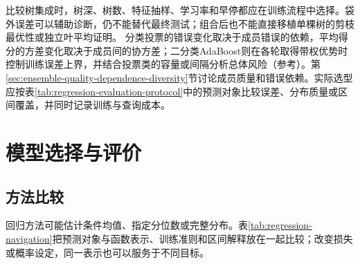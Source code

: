 比较树集成时，树深、树数、特征抽样、学习率和早停都应在训练流程中选择。袋外误差可以辅助诊断，仍不能替代最终测试；组合后也不能直接移植单棵树的剪枝最优性或独立叶平均证明。
分类投票的错误变化取决于成员错误的依赖，平均得分的方差变化取决于成员间的协方差；二分类AdaBoost则在各轮取得带权优势时控制训练误差上界，并结合投票类的容量或间隔分析总体风险（参考）。第\ref{sec:ensemble-quality-dependence-diversity}节讨论成员质量和错误依赖。实际选型应按表\ref{tab:regression-evaluation-protocol}中的预测对象比较误差、分布质量或区间覆盖，并同时记录训练与查询成本。

\section{模型选择与评价}
\label{sec:regression-evaluation}

\subsection{方法比较}

回归方法可能估计条件均值、指定分位数或完整分布。表\ref{tab:regression-navigation}把预测对象与函数表示、训练准则和区间解释放在一起比较；改变损失或概率设定，同一表示也可以服务于不同目标。

